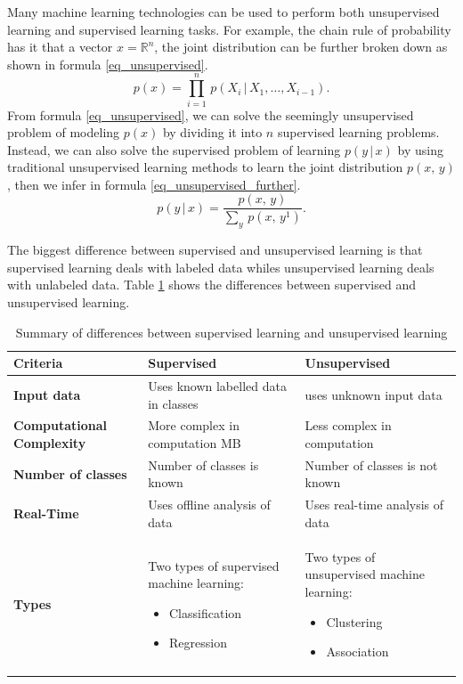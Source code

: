 \documentclass[master]{thesis-uestc}
\begin{document}
Many machine learning technologies can be used to perform both unsupervised learning and supervised learning tasks. For example, the chain rule of probability has it that a vector $x = \mathbb{R}^n$, the joint distribution can be further broken down as shown in formula \ref{eq_unsupervised}.
\begin{equation}
    p(x) = {\displaystyle \prod_{i=1}^{n}}\,p(X_i\,|\,X_1,\dots,X_{i-1}).
    \label{eq_unsupervised}
\end{equation}
From formula \ref{eq_unsupervised}, we can solve the seemingly unsupervised problem of modeling $p(x)$ by dividing it into $n$ supervised learning problems. Instead, we can also solve the supervised problem of learning $p(y\,|\,x)$ by using traditional unsupervised learning methods to learn the joint distribution $p(x,\,y)$, then we infer in formula \ref{eq_unsupervised_further}.
\begin{equation}
    p(y\,|\,x) = \frac{p(x,\,y)}{\sum_y\,p(x,\,y^1)}.
\label{eq_unsupervised_further}
\end{equation}

The biggest difference between supervised and unsupervised learning is that supervised learning deals with labeled data whiles unsupervised learning deals with unlabeled data. Table \ref{diff_supervised_unsupervised} shows the differences between supervised and unsupervised learning.

\begin{center}
\begin{table}
\caption{Summary of differences between supervised learning and unsupervised learning}
\begin{tabular}{ | m{10em} | m{5cm}| m{5cm} | } 
\hline
\textbf{Criteria} & \textbf{Supervised} & \textbf{Unsupervised} \\ 
\hline
\textbf{Input data} & Uses known labelled data in classes & uses unknown input data  \\ 
\hline
\textbf{Computational Complexity} & More complex in computation MB & Less complex in computation \\ 
\hline
\textbf{Number of classes} & Number of classes is known & Number of classes is not known \\
\hline
\textbf{Real-Time} & Uses offline analysis of data & Uses real-time analysis of data \\
\hline
\textbf{Types} & Two types of supervised machine learning:
\begin{itemize}
    \item Classification
    \item Regression
\end{itemize}& Two types of unsupervised machine learning:
\begin{itemize}
    \item Clustering
    \item Association
\end{itemize}\\
\hline
\end{tabular}
\label{diff_supervised_unsupervised}
\end{table}
\end{center}
\end{document}

